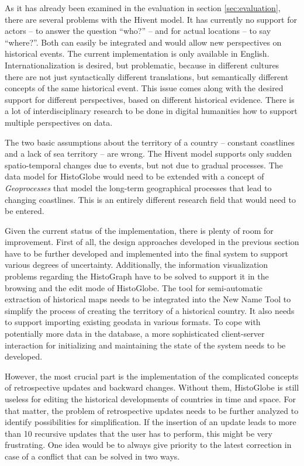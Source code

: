 As it has already been examined in the evaluation in section \ref{sec:evaluation}, there are several problems with the Hivent model. It has currently no support for actors -- to answer the question ``who?'' -- and for actual locations -- to say ``where?''. Both can easily be integrated and would allow new perspectives on historical events. The current implementation is only available in English. Internationalization is desired, but problematic, because in different cultures there are not just syntactically different translations, but semantically different concepts of the same historical event. This issue comes along with the desired support for different perspectives, based on different historical evidence. There is a lot of interdisciplinary research to be done in digital humanities how to support multiple perspectives on data.

The two basic assumptions about the territory of a country -- constant coastlines and a lack of sea territory -- are wrong. The Hivent model supports only sudden spatio-temporal changes due to events, but not due to gradual processes. The data model for HistoGlobe would need to be extended with a concept of \emph{Geoprocesses} that model the long-term geographical processes that lead to changing coastlines. This is an entirely different research field that would need to be entered.

Given the current status of the implementation, there is plenty of room for improvement. First of all, the design approaches developed in the previous section have to be further developed and implemented into the final system to support various degrees of uncertainty. Additionally, the information visualization problems regarding the HistoGraph have to be solved to support it in the browsing and the edit mode of HistoGlobe. The tool for semi-automatic extraction of historical maps needs to be integrated into the New Name Tool to simplify the process of creating the territory of a historical country. It also needs to support importing existing geodata in various formats. To cope with potentially more data in the database, a more sophisticated client-server interaction for initializing and maintaining the state of the system needs to be developed.

However, the most crucial part is the implementation of the complicated concepts of retrospective updates and backward changes. Without them, HistoGlobe is still useless for editing the historical developments of countries in time and space. For that matter, the problem of retrospective updates needs to be further analyzed to identify possibilities for simplification. If the insertion of an update leads to more than 10 recursive updates that the user has to perform, this might be very frustrating. One idea would be to always give priority to the latest correction in case of a conflict that can be solved in two ways.

